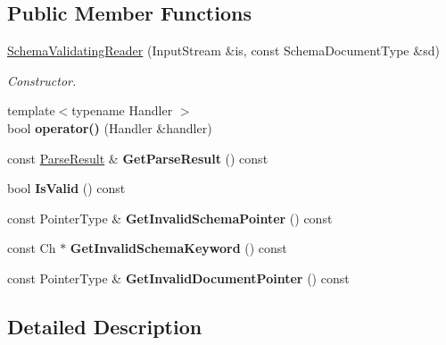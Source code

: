 \subsection*{Public Member Functions}
\begin{DoxyCompactItemize}
\item 
\hyperlink{class_schema_validating_reader_ae7945b71687ad3dd13b9c3d096892eac}{Schema\+Validating\+Reader} (Input\+Stream \&is, const Schema\+Document\+Type \&sd)
\begin{DoxyCompactList}\small\item\em Constructor. \end{DoxyCompactList}\item 
\mbox{\label{class_schema_validating_reader_a7135d8d53aacd850fbce2901cca4a4c3}} 
{\footnotesize template$<$typename Handler $>$ }\\bool {\bfseries operator()} (Handler \&handler)
\item 
\mbox{\label{class_schema_validating_reader_add1def2be62e1443a88c7792e5b34e3b}} 
const \hyperlink{struct_parse_result}{Parse\+Result} \& {\bfseries Get\+Parse\+Result} () const
\item 
\mbox{\label{class_schema_validating_reader_a3c04fa90a430a67a993a2b8876e89ff4}} 
bool {\bfseries Is\+Valid} () const
\item 
\mbox{\label{class_schema_validating_reader_a9accbbcbe9afbbe26300d943ccb46362}} 
const Pointer\+Type \& {\bfseries Get\+Invalid\+Schema\+Pointer} () const
\item 
\mbox{\label{class_schema_validating_reader_ac3192b08923b4d68d04462b0b61ded1c}} 
const Ch $\ast$ {\bfseries Get\+Invalid\+Schema\+Keyword} () const
\item 
\mbox{\label{class_schema_validating_reader_a53051bfc38cb24368fc40e4334102da8}} 
const Pointer\+Type \& {\bfseries Get\+Invalid\+Document\+Pointer} () const
\end{DoxyCompactItemize}


\subsection{Detailed Description}
